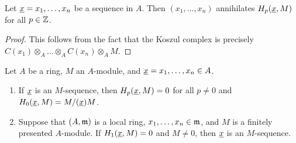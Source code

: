 \begin{corollary}
    Let $\underline{x} = x_1,\dots,x_n$ be a sequence in $A$. Then $(x_1,\dots,x_n)$ annihilates $H_p(\underline{x}, M)$ for all $p\in\mathbb{Z}$.
\end{corollary}
\begin{proof}
    This follows from the fact that the Koszul complex is precisely $C(x_1)\otimes_A\dots\otimes_A C(x_n)\otimes_A M$.
\end{proof}

\begin{theorem}
    Let $A$ be a ring, $M$ an $A$-module, and $\underline{x} = x_1,\dots,x_n\in A$. 
    \begin{enumerate}[label=(\arabic*)]
        \item If $\underline{x}$ is an $M$-sequence, then $H_p(\underline{x}, M) = 0$ for all $p\ne 0$ and $H_0(\underline{x}, M) = M/(\underline{x})M$.
        \item Suppose that $(A,\mathfrak{m})$ is a local ring, $x_1,\dots,x_n\in\mathfrak{m}$, and $M$ is a finitely presented $A$-module. If $H_1(\underline{x}, M) = 0$ and $M\ne 0$, then $\underline{x}$ is an $M$-sequence.
    \end{enumerate}
\end{theorem}
